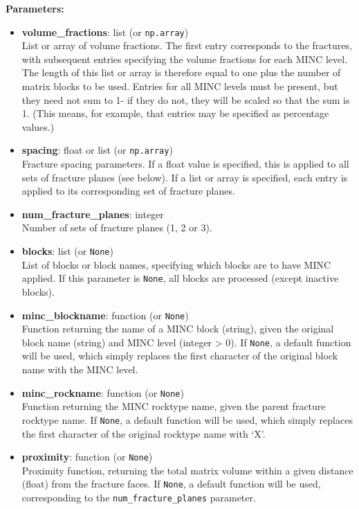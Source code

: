 \textbf{Parameters:}
\begin{itemize}
\item \textbf{volume\_fractions}: list (or \texttt{np.array})\\
  List or array of volume fractions. The first entry corresponds to the fractures, with subsequent entries specifying the volume fractions for each MINC level. The length of this list or array is therefore equal to one plus the number of matrix blocks to be used. Entries for all MINC levels must be present, but they need not sum to 1- if they do not, they will be scaled so that the sum is 1. (This means, for example, that entries may be specified as percentage values.)
\item \textbf{spacing}: float or list (or \texttt{np.array})\\
  Fracture spacing parameters. If a float value is specified, this is applied to all sets of fracture planes (see below). If a list or array is specified, each entry is applied to its corresponding set of fracture planes.
\item \textbf{num\_fracture\_planes}: integer\\
  Number of sets of fracture planes (1, 2 or 3).
\item \textbf{blocks}: list (or \texttt{None})\\
  List of blocks or block names, specifying which blocks are to have MINC applied. If this parameter is \texttt{None}, all blocks are processed (except inactive blocks).
\item \textbf{minc\_blockname}: function (or \texttt{None})\\
  Function returning the name of a MINC block (string), given the original block name (string) and MINC level (integer > 0). If \texttt{None}, a default function will be used, which simply replaces the first character of the original block name with the MINC level.
\item \textbf{minc\_rockname}: function (or \texttt{None})\\
  Function returning the MINC rocktype name, given the parent fracture rocktype name. If \texttt{None}, a default function will be used, which simply replaces the first character of the original rocktype name with `X'.
\item \textbf{proximity}: function (or \texttt{None})\\
  Proximity function, returning the total matrix volume within a given distance (float) from the fracture faces. If \texttt{None}, a default function will be used, corresponding to the \texttt{num\_fracture\_planes} parameter.
\end{itemize}


